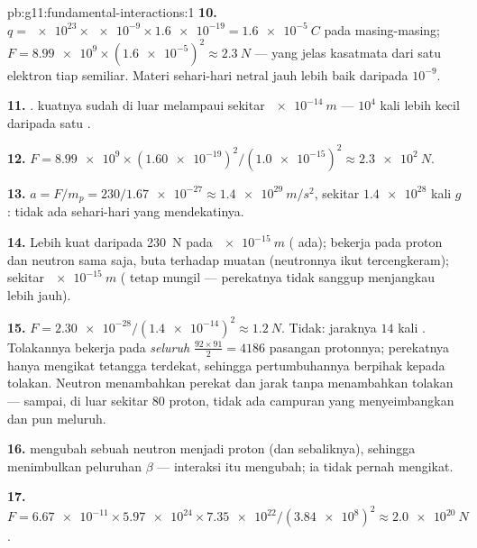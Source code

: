 \begin{solution}{pb:g11:fundamental-interactions:1}
\textbf{10.} $q = \num{e23} \times \num{e-9} \times \num{1.6e-19} =
\qty{1.6e-5}{C}$ pada masing-masing;
$F = \num{8.99e9} \times (\num{1.6e-5})^2 \approx \qty{2.3}{N}$ ---
 yang jelas kasatmata dari satu elektron tiap semiliar. Materi
sehari-hari netral jauh lebih baik daripada $10^{-9}$.

\textbf{11.} .  kuatnya sudah di luar
 melampaui sekitar $\qty{e-14}{m}$ --- $10^{4}$ kali lebih
kecil daripada satu .

\textbf{12.} $F = \num{8.99e9} \times (\num{1.60e-19})^2 /
(\num{1.0e-15})^2 \approx \qty{2.3e2}{N}$.

\textbf{13.} $a = F/m_p = 230/\num{1.67e-27} \approx
\qty{1.4e29}{m/s^2}$, sekitar $\num{1.4e28}$ kali $g$: tidak ada 
sehari-hari yang mendekatinya.

\textbf{14.} Lebih kuat daripada \qty{230}{N} pada $\qty{e-15}{m}$
( ada); bekerja pada proton dan neutron sama saja, buta
terhadap muatan (neutronnya ikut tercengkeram);  sekitar
$\qty{e-15}{m}$ ( tetap mungil --- perekatnya tidak sanggup
menjangkau lebih jauh).

\textbf{15.} $F = \num{2.30e-28}/(\num{1.4e-14})^2 \approx
\qty{1.2}{N}$. Tidak: jaraknya $14$ kali . Tolakannya
bekerja pada \emph{seluruh} $\frac{92\times91}{2} = 4186$ pasangan
protonnya; perekatnya hanya mengikat tetangga terdekat, sehingga
pertumbuhannya berpihak kepada tolakan. Neutron menambahkan perekat dan
jarak tanpa menambahkan tolakan --- sampai, di luar sekitar $80$ proton,
tidak ada campuran yang menyeimbangkan dan  pun meluruh.

\textbf{16.}  mengubah sebuah neutron menjadi proton
(dan sebaliknya), sehingga menimbulkan peluruhan $\beta$ --- interaksi
itu mengubah; ia tidak pernah mengikat.

\textbf{17.} $F = \num{6.67e-11} \times \num{5.97e24} \times
\num{7.35e22}/(\num{3.84e8})^2 \approx \qty{2.0e20}{N}$.


\end{solution}
